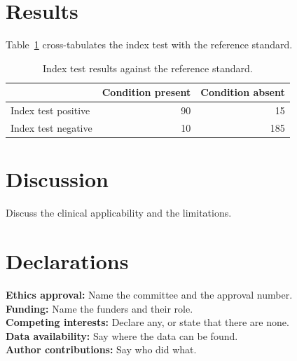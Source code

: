 \documentclass[11pt,a4paper]{article}
\begin{document}
\section{Results}
Table~\ref{tab:accuracy} cross-tabulates the index test with the reference standard.

\begin{table}[htbp]
  \centering
  \caption{Index test results against the reference standard.}
  \label{tab:accuracy}
  \begin{tabular}{lrr}
    \toprule
     & Condition present & Condition absent \\
    \midrule
    Index test positive & 90 & 15 \\
    Index test negative & 10 & 185 \\
    \bottomrule
  \end{tabular}
\end{table}

\section{Discussion}
Discuss the clinical applicability and the limitations.

\section*{Declarations}
\noindent\textbf{Ethics approval:} Name the committee and the approval number.\\
\textbf{Funding:} Name the funders and their role.\\
\textbf{Competing interests:} Declare any, or state that there are none.\\
\textbf{Data availability:} Say where the data can be found.\\
\textbf{Author contributions:} Say who did what.



\end{document}
